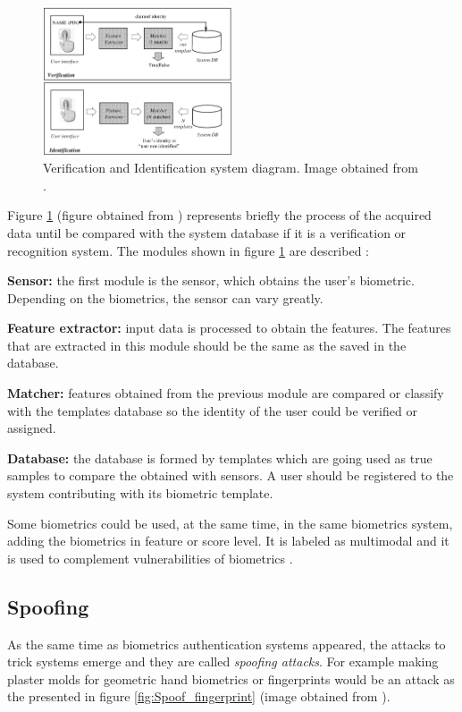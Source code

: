\begin{figure}[htb]
\centering
\includegraphics[width=0.5\textwidth]{images_miscelaneus/verif_identif.PNG}
\caption{Verification and Identification system diagram. Image obtained from \cite{Intro_biometrics2}.} \label{fig:Verif_ident}
\end{figure}

Figure \ref{fig:Verif_ident} (figure obtained from \cite{Intro_biometrics2}) represents briefly the process of the acquired data until be compared  with the system database if it is a verification or recognition system. The modules shown in figure \ref{fig:Verif_ident} are described \cite{Intro_biometrics2}:
\begin{description}[itemsep=2pt,topsep=8pt,parsep=0pt,partopsep=20pt]
\item \textbf{Sensor:} the first module is the sensor, which obtains the user's biometric. Depending on the biometrics, the sensor can vary greatly.
\item \textbf{Feature extractor:} input data is processed to obtain the features. The features that are extracted in this module should be the same as the saved in the database.
\item \textbf{Matcher:} features obtained from the previous module are compared or classify with the templates database so the identity of the user could be verified or assigned.
\item \textbf{Database:} the database is formed by templates which are going used as true samples to compare the obtained with sensors. A user should be registered to the system contributing with its biometric template.
\end{description}

Some biometrics could be used, at the same time, in the same biometrics system, adding the biometrics in feature or score level. It is labeled as multimodal and it is used to complement vulnerabilities of biometrics \cite{Spoofing_survey}.

\subsection{Spoofing}
As the same time as biometrics authentication systems appeared, the attacks to trick systems emerge and they are called \textit{spoofing attacks}. For example making plaster molds for geometric hand biometrics or fingerprints would be an attack as the presented in figure \ref{fig:Spoof_fingerprint} (image obtained from \cite{fingerprint_image}).\\

